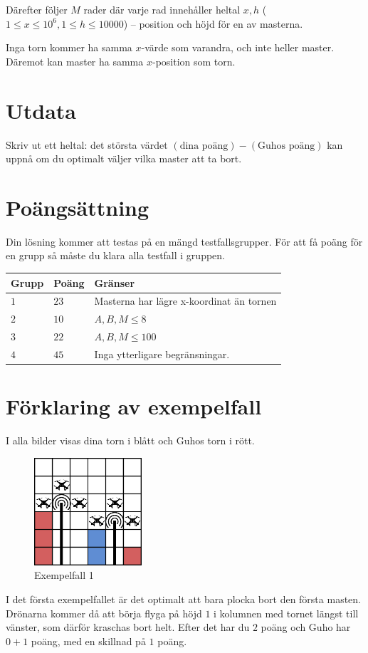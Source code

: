 Därefter följer $M$ rader där varje rad innehåller heltal $x,h$ ($1 \leq x \leq 10^6, 1\leq h \leq 10000$) -- position och höjd för en av masterna.

Inga torn kommer ha samma $x$-värde som varandra, och inte heller master.
Däremot kan master ha samma $x$-position som torn.

\section*{Utdata}
Skriv ut ett heltal: det största värdet $(\text{dina poäng}) - (\text{Guhos poäng})$ kan uppnå om du optimalt väljer vilka master att ta bort.

\section*{Poängsättning}
Din lösning kommer att testas på en mängd testfallsgrupper.
För att få poäng för en grupp så måste du klara alla testfall i gruppen.

\noindent
\begin{tabular}{| l | l | p{12cm} |}
  \hline
  \textbf{Grupp} & \textbf{Poäng} & \textbf{Gränser} \\ \hline
  $1$   & $23$       & Masterna har lägre x-koordinat än tornen \\ \hline
  $2$   & $10$       & $A,B,M \leq 8$\\ \hline
  $3$   & $22$       & $A,B,M \leq 100$  \\ \hline
  $4$   & $45$       & Inga ytterligare begränsningar.  \\ \hline
\end{tabular}

\section*{Förklaring av exempelfall}
I alla bilder visas dina torn i blått och Guhos torn i rött.

\begin{figure}[!h]
  \centering
  \includegraphics[width=4cm]{sample1.png}
  \caption{Exempelfall 1}
\end{figure}
I det första exempelfallet är det optimalt att bara plocka bort den första masten.
Drönarna kommer då att börja flyga på höjd $1$ i kolumnen med tornet längst till vänster, som därför kraschas bort helt.
Efter det har du $2$ poäng och Guho har $0+1$ poäng, med en skillnad på $1$ poäng.

